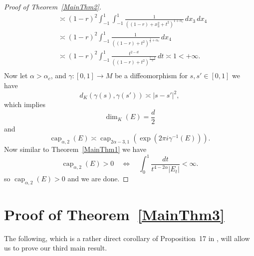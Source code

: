\documentclass[a4paper,12pt]{amsart}
\theoremstyle{definition}
\theoremstyle{remark}
\begin{document}
\begin{proof} [Proof of Theorem~\ref{MainThm2}]
\begin{equation}
\begin{aligned}
        &\asymp (1 - r)^2 \int_{-1}^1 \int_{-1}^1  
        \frac{1}{((1-r) + x_3^2 + t^2)^{1 + \alpha_c}} \, dx_3\, dx_4 \\
        &\asymp (1 - r)^2 \int_{-1}^1  
        \frac{1}{((1-r) + t^2)^{\frac{1}{2} + \alpha_c}} \, dx_4 \\
        &\asymp (1 - r)^2 \int_{-1}^1  
        \frac{t^{2-d}}{((1-r) + t^2)^{\frac{5-d}{2}}} \, dt \asymp 1 < +\infty. \\
        \end{aligned}
    \end{equation}
    Now let $\alpha > \alpha_c$, and $\gamma : [0,1] \rightarrow M$ be a diffeomorphism for $s,s' \in [0,1]$ we have
    \begin{equation*}
        d_K(\gamma(s),\gamma(s')) \asymp |s-s'|^2,
    \end{equation*}
    which implies
    \begin{equation*}
       \dim_{K}(E) = \frac{d}{2}
    \end{equation*}
    and
    \begin{equation*}
            \operatorname{cap}_{\alpha,2}(E) \asymp \operatorname{cap}_{2\alpha-3,1}(\exp{\left(2\pi i \gamma^{-1}(E)\right)}).
    \end{equation*}
    Now similar to Theorem~{\ref{MainThm1}} we have
    \begin{equation*}
        \operatorname{cap}_{\alpha,2}({E}) > 0 
        \quad \Longleftrightarrow \quad
        \int_{0}^{1} \frac{dt}{t^{4 -2\alpha} |E_{t}|} < \infty .
    \end{equation*}
    so $\operatorname{cap}_{\alpha,2}(E)> 0$ and we are done.
\end{proof}

\section{Proof of Theorem~{\ref{MainThm3}}} \label{Section5}
    
    The following, which is a rather direct corollary of Proposition~{17} in \cite{Chaumat_Chollet_Hausdorff}, will allow us to prove our third main result. 
\end{document}
